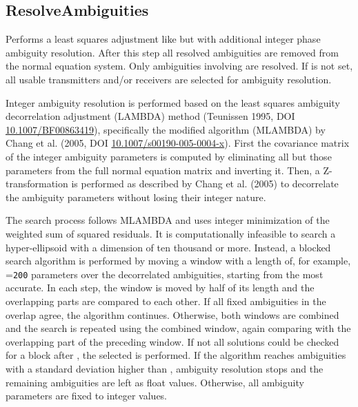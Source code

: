 \subsection{ResolveAmbiguities}\label{gnssProcessingStepType:resolveAmbiguities}
Performs a least squares adjustment like 
but with additional integer phase ambiguity resolution.
After this step all resolved ambiguities are removed from the normal equation system.
Only ambiguities involving  are resolved.
If  is not set, all usable transmitters and/or 
receivers are selected for ambiguity resolution.

Integer ambiguity resolution is performed based on the least squares ambiguity decorrelation adjustment
(LAMBDA) method (Teunissen 1995, DOI \href{https://doi.org/10.1007/BF00863419}{10.1007/BF00863419}), specifically
the modified algorithm (MLAMBDA) by Chang et al. (2005, DOI \href{https://doi.org/10.1007/s00190-005-0004-x}{10.1007/s00190-005-0004-x}).
First the covariance matrix of the integer ambiguity parameters is computed by eliminating all but those parameters
from the full normal equation matrix and inverting it. Then, a Z-transformation is performed as described by
Chang et al. (2005) to decorrelate the ambiguity parameters without losing their integer nature.

The search process follows MLAMBDA and uses integer minimization of the weighted sum of squared residuals.
It is computationally infeasible to search a hyper-ellipsoid with a dimension of ten thousand or more.
Instead, a blocked search algorithm is performed by moving a window with a length of, for example,
=\verb|200| parameters over the decorrelated ambiguities, starting from the most accurate.
In each step, the window is moved by half of its length and the overlapping parts are compared to each other.
If all fixed ambiguities in the overlap agree, the algorithm continues.
Otherwise, both windows are combined and the search is repeated using the combined window, again comparing with the overlapping
part of the preceding window. If not all solutions could be checked for a block after ,
the selected  is performed.
If the algorithm reaches ambiguities with a standard deviation higher than ,
ambiguity resolution stops and the remaining ambiguities are left as float values.
Otherwise, all ambiguity parameters are fixed to integer values.

